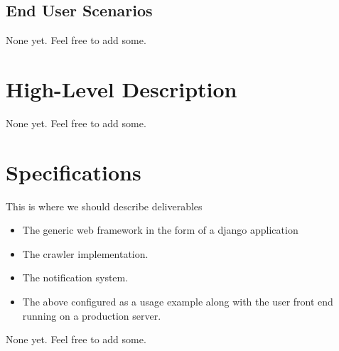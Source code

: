 \documentclass[a4paper,10pt]{article} \usepackage{anysize}
\begin{document}
    \subsection{End User Scenarios}
        None yet. Feel free to add some.

\section{High-Level Description}
    None yet. Feel free to add some.

\section{Specifications}
    This is where we should describe deliverables
    \begin{itemize}
            \item The generic web framework in the form of a django application
            \item The crawler implementation.
            \item The notification system.
            \item The above configured as a usage example along with the user
                front end running on a production server.
    \end{itemize}
    None yet. Feel free to add some.
\end{document}
